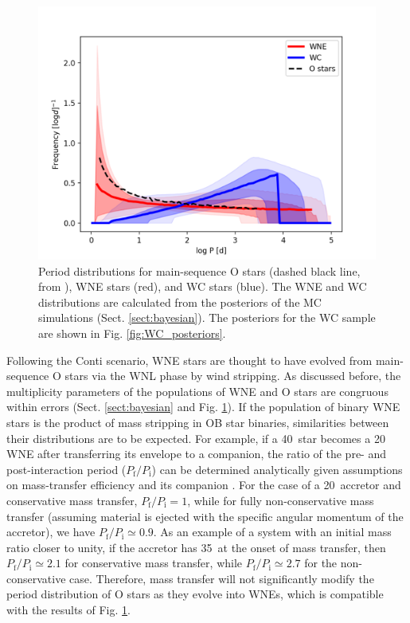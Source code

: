  
\begin{figure}
    \centering
    \includegraphics[width=\textwidth]{chapters/WNE/image/PeriodDistShift.png}
    \caption{Period distributions for main-sequence O stars (dashed black line, from \citet{sana_binary_2012}), WNE stars (red), and WC stars (blue). The WNE and WC distributions are calculated from the posteriors of the MC simulations (Sect. \ref{sect:bayesian}). The posteriors for the WC sample are shown in Fig. \ref{fig:WC_posteriors}.}
    \label{fig:periodDistShift}
\end{figure}

Following the Conti scenario, WNE stars are thought to have evolved from main-sequence O stars via the WNL phase by wind stripping. As discussed before, the multiplicity parameters of the populations of WNE and O stars are congruous within errors (Sect. \ref{sect:bayesian} and Fig. \ref{fig:periodDistShift}). If the population of binary WNE stars is the product of mass stripping in OB star binaries, similarities between their distributions are to be expected. For example, if a 40\,\Msun{} star becomes a 20\,\Msun{} WNE after transferring its envelope to a companion, the ratio of the pre- and post-interaction period ($P_\mathrm{f}/P_\mathrm{i}$) can be determined analytically given assumptions on mass-transfer efficiency and its companion \citep{1997SobermanMassTransfer}. For the case of a 20\,\Msun{} accretor and conservative mass transfer, $P_\mathrm{f}/P_\mathrm{i}=1$, while for fully non-conservative mass transfer (assuming material is ejected with the specific angular momentum of the accretor), we have $P_\mathrm{f}/P_\mathrm{i}\simeq 0.9$. As an example of a system with an initial mass ratio closer to unity, if the accretor has 35\,\Msun{} at the onset of mass transfer, then $P_\mathrm{f}/P_\mathrm{i}\simeq 2.1$ for conservative mass transfer, while $P_\mathrm{f}/P_\mathrm{i}\simeq 2.7$ for the non-conservative case. Therefore, mass transfer will not significantly modify the period distribution of O stars as they evolve into WNEs, which is compatible with the results of Fig. \ref{fig:periodDistShift}.

